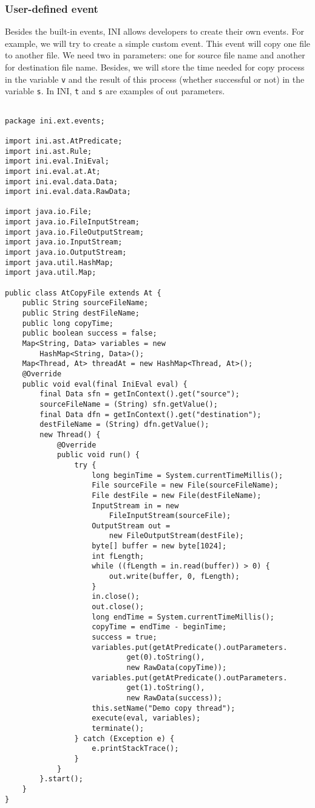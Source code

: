 \documentclass[11pt]{article}
\begin{document}
\subsubsection{User-defined event}
Besides the built-in events, INI allows developers to create their own events. For example, we will try to create a simple custom event. This event will copy one file to another file. We need two in parameters: one for source file name and another for destination file name. Besides, we will store the time needed for copy process in the variable \texttt{v} and the result of this process (whether successful or not) in the variable \texttt{s}. In INI, \texttt{t} and \texttt{s} are examples of out parameters.
\begin{lstlisting}

package ini.ext.events;

import ini.ast.AtPredicate;
import ini.ast.Rule;
import ini.eval.IniEval;
import ini.eval.at.At;
import ini.eval.data.Data;
import ini.eval.data.RawData;

import java.io.File;
import java.io.FileInputStream;
import java.io.FileOutputStream;
import java.io.InputStream;
import java.io.OutputStream;
import java.util.HashMap;
import java.util.Map;

public class AtCopyFile extends At {
	public String sourceFileName;
	public String destFileName;
	public long copyTime;
	public boolean success = false;
	Map<String, Data> variables = new 
        HashMap<String, Data>();
	Map<Thread, At> threadAt = new HashMap<Thread, At>();
	@Override
	public void eval(final IniEval eval) {
		final Data sfn = getInContext().get("source");
		sourceFileName = (String) sfn.getValue();
		final Data dfn = getInContext().get("destination");
		destFileName = (String) dfn.getValue();
		new Thread() {
			@Override
			public void run() {
				try {
					long beginTime = System.currentTimeMillis();
					File sourceFile = new File(sourceFileName);
					File destFile = new File(destFileName);
					InputStream in = new 
                        FileInputStream(sourceFile);
					OutputStream out = 
                        new FileOutputStream(destFile);
					byte[] buffer = new byte[1024];
					int fLength;
					while ((fLength = in.read(buffer)) > 0) {
						out.write(buffer, 0, fLength);
					}
					in.close();
					out.close();
					long endTime = System.currentTimeMillis();
					copyTime = endTime - beginTime;
					success = true;
					variables.put(getAtPredicate().outParameters.
                            get(0).toString(),
							new RawData(copyTime));
					variables.put(getAtPredicate().outParameters.
                            get(1).toString(),
							new RawData(success));
					this.setName("Demo copy thread");
					execute(eval, variables);
					terminate();
				} catch (Exception e) {
					e.printStackTrace();
				}
			}
		}.start();
	}
}
\end{lstlisting}
\end{document}
